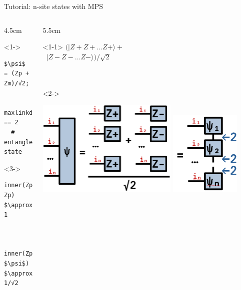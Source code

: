 \begin{frame}[fragile]{Tutorial: n-site states with MPS}

\begin{columns}

\begin{column}{4.5cm}

\begin{onlyenv}<1->
\begin{lstlisting}[language=JuliaLocal, style=julia, mathescape, basicstyle=\scriptsize\ttfamily]
$\psi$ = (Zp + Zm)/√2;


maxlinkdim($\psi$) == 2
  # entangled state
\end{lstlisting}
\end{onlyenv}

\begin{onlyenv}<3->
~\\
\begin{lstlisting}[language=JuliaLocal, style=julia, mathescape, basicstyle=\scriptsize\ttfamily]
  inner(Zp, Zp) $\approx$ 1


  inner(Zp, $\psi$) $\approx$ 1/√2
\end{lstlisting}
\end{onlyenv}

\end{column}

\begin{column}{5.5cm}

\begin{onlyenv}<1-1>
$(|Z+Z+\dots Z+\rangle +$ \\
\  $|Z-Z-\dots Z-\rangle)/\sqrt{2}$ \\
~\\
~\\
\end{onlyenv}

\begin{onlyenv}<2->
\begin{center}
\includegraphics[width=0.6\textwidth]{
  slides/assets/catn.png
}
\includegraphics[width=0.3\textwidth]{
  slides/assets/catn_mps.png
}
\end{center}
\end{onlyenv}


\end{column}
\end{columns}
\end{frame}
